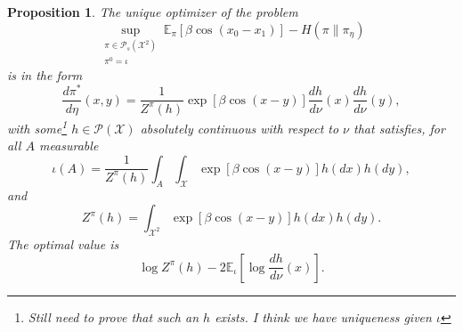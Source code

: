 \documentclass[12pt]{article}
\newtheorem{proposition}[theorem]{Proposition}
\numberwithin{equation}{section}
\begin{document}
\begin{proposition}
    The unique optimizer of the problem
    \begin{equation*}
        \sup_{\substack{\pi\in\mathcal{P}_s(\mathcal{X}^2)\\ \pi^0=\iota}}\mathbb{E}_{\pi}[\beta\cos(x_0-x_1)] - H(\pi\|\pi_\eta)
    \end{equation*}
    is in the form
    \begin{equation*}
        \frac{d\pi^*}{d\eta}(x, y) = \frac{1}{Z^\pi(h)}\exp[\beta \cos(x - y)]\frac{dh}{d\nu}(x)\frac{dh}{d\nu}(y),
    \end{equation*}
    with some\footnote{Still need to prove that such an $h$ exists. I think we have uniqueness given $\iota$} $h\in\mathcal{P}(\mathcal{X})$ absolutely continuous with respect to $\nu$ that satisfies, for all $A$ measurable
    \begin{equation}\label{Eq.XY-h-pi0}
        \iota(A) = \frac{1}{Z^\pi(h)}\int_A\int_\mathcal{X}\exp[\beta \cos(x - y)]h(dx)h(dy),
    \end{equation}
    and
    \begin{equation*}
        Z^\pi(h) = \int_{\mathcal{X}^2}\exp[\beta \cos(x - y)]h(dx)h(dy).
    \end{equation*}
    The optimal value is
    \begin{equation*}
        \log Z^\pi(h) - 2\mathbb{E}_{\iota}\left[\log\frac{dh}{d\nu}(x)\right].
    \end{equation*}
\end{proposition}
\end{document}
